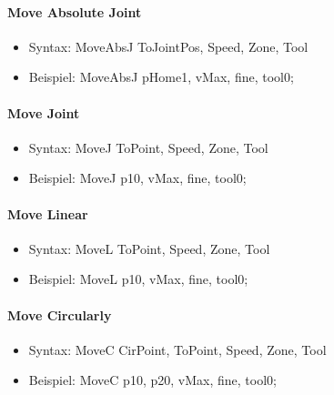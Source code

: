 \paragraph{Move Absolute Joint}
\begin{itemize}
	\item Syntax: MoveAbsJ ToJointPos, Speed, Zone, Tool
	\item Beispiel: MoveAbsJ pHome1, vMax, fine, tool0;
\end{itemize}
\paragraph{Move Joint}
\begin{itemize}
	\item Syntax: MoveJ ToPoint, Speed, Zone, Tool
	\item Beispiel: MoveJ p10, vMax, fine, tool0;
\end{itemize}
\paragraph{Move Linear}
\begin{itemize}
	\item Syntax: MoveL ToPoint, Speed, Zone, Tool
	\item Beispiel: MoveL p10, vMax, fine, tool0;
\end{itemize}
\paragraph{Move Circularly}
\begin{itemize}
	\item Syntax: MoveC CirPoint, ToPoint, Speed, Zone, Tool
	\item Beispiel: MoveC p10, p20, vMax, fine, tool0;
\end{itemize}
